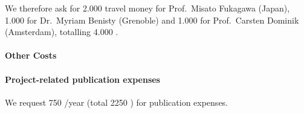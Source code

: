 \documentclass[10pt,fleqn,twoside]{article}
\begin{document}
We therefore ask for 2.000 \EUR{} travel money for Prof.~Misato Fukagawa
(Japan), 1.000 \EUR{} for Dr.~Myriam Benisty (Grenoble) and 1.000 \EUR{} for
Prof.~Carsten Dominik (Amsterdam), totalling 4.000 \EUR{}.

\paragraph{Other Costs}

\paragraph{Project-related publication expenses}
We request 750 \EUR{}/year (total 2250 \EUR{}) for publication expenses.



% 
% 
% 
% 
% 
% 
% 
% 
% 
% 
% 
% 
\end{document}
